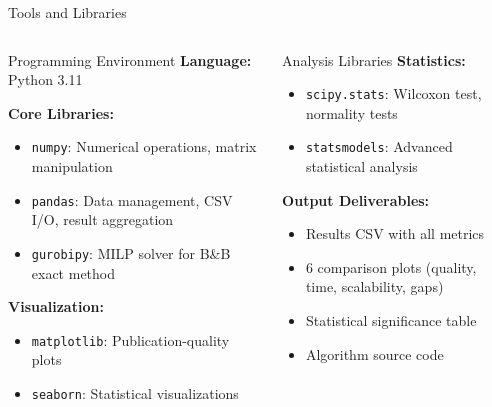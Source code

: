 \documentclass[aspectratio=43,8pt]{beamer}
\begin{document}
\begin{frame}{Tools and Libraries}
\begin{columns}[t]
\begin{block}{Programming Environment}
\textbf{Language:} Python 3.11

\vspace{0.2cm}
\textbf{Core Libraries:}
\begin{itemize}
    \item \texttt{numpy}: Numerical operations, matrix manipulation
    \item \texttt{pandas}: Data management, CSV I/O, result aggregation
    \item \texttt{gurobipy}: MILP solver for B\&B exact method
\end{itemize}

\vspace{0.2cm}
\textbf{Visualization:}
\begin{itemize}
    \item \texttt{matplotlib}: Publication-quality plots
    \item \texttt{seaborn}: Statistical visualizations
\end{itemize}
\end{block}

\begin{exampleblock}{Analysis Libraries}
\textbf{Statistics:}
\begin{itemize}
    \item \texttt{scipy.stats}: Wilcoxon test, normality tests
    \item \texttt{statsmodels}: Advanced statistical analysis
\end{itemize}

\vspace{0.3cm}
\textbf{Output Deliverables:}
\begin{itemize}
    \item Results CSV with all metrics
    \item 6 comparison plots (quality, time, scalability, gaps)
    \item Statistical significance table
    \item Algorithm source code
\end{itemize}
\end{exampleblock}
\end{columns}
\end{frame}
\end{document}
